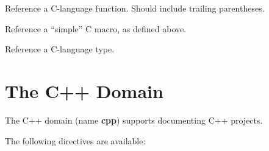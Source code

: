 \documentclass[letterpaper,10pt,english]{sphinxmanual}
\begin{document}

\begin{fulllineitems}
\label{domains:role-c:func}
Reference a C-language function. Should include trailing parentheses.

\end{fulllineitems}


\begin{fulllineitems}
\label{domains:role-c:macro}
Reference a ``simple'' C macro, as defined above.

\end{fulllineitems}


\begin{fulllineitems}
\label{domains:role-c:type}
Reference a C-language type.

\end{fulllineitems}



\section{The C++ Domain}
\label{domains:id9}
The C++ domain (name \textbf{cpp}) supports documenting C++ projects.

The following directives are available:
\end{document}
